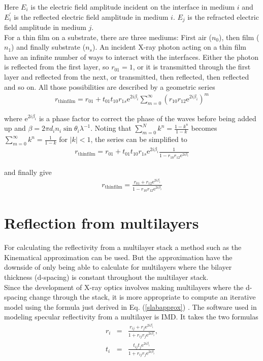 Here $E_i$ is the electric field amplitude incident on the interface in medium $i$ and $E_i^{'}$ is the reflected electric field amplitude in medium $i$. $E_j$ is the refracted electric field amplitude in medium $j$.\\

For a thin film on a substrate, there are three mediums: First air ($n_0$), then film ($n_1$) and finally substrate ($n_s$). An incident X-ray photon acting on a thin film have an infinite number of ways to interact with the interfaces. Either the photon is reflected from the first layer, so $r_{01} = 1$, or it is transmitted through the first layer and reflected from the next, or transmitted, then reflected, then reflected and so on. All those possibilities are described by a geometric series
\begin{eqnarray}
	r_{\mathrm{thin film}} = r_{01} + t_{01}t_{10}r_{1s}\mathrm{e}^{2 i \beta_i}\sum_{m=0}^{\infty}(r_{10}r_{12}\mathrm{e}^{2 i \beta_i})^m
\end{eqnarray}

where $\mathrm{e}^{2i\beta_i}$ is a phase factor to correct the phase of the waves before being added up and $\beta = 2 \pi d_i n_i \sin{\theta_i}\lambda^{-1}$. Noting that $\sum_{m=0}^{N}k^n = \frac{1 - k^n}{1-k}$ becomes $\sum_{m=0}^{\infty}k^n = \frac{1}{1-k}$ for $|k| < 1$, the series can be simplified to
\begin{eqnarray}
	r_{\mathrm{thin film}} = r_{01} + t_{01}t_{10}r_{1s}\mathrm{e}^{2i\beta_i}\frac{1}{1-r_{10}r_{12}\mathrm{e}^{2i\beta_i}}
\end{eqnarray}

and finally give
\begin{eqnarray}
	r_{\mathrm{thin film}} = \frac{r_{01} + r_{12}\mathrm{e}^{2i\beta_i}}{1-r_{10}r_{12}\mathrm{e}^{2i\beta_i}} \label{slabapprox}
\end{eqnarray}

\section{Reflection from multilayers}
For calculating the reflectivity from a multilayer stack a method such as the Kinematical approximation can be used. But the approximation have the downside of only being able to calculate for multilayers where the bilayer thickness (d-spacing) is constant throughout the multilayer stack. \\
Since the development of X-ray optics involves making multilayers where the d-spacing change through the stack, it is more appropriate to compute an iterative model using the formula just derived in Eq. (\ref{slabapprox}) . The software used in modeling specular reflectivity from a multilayer is IMD\cite{Windt:1998tb}. It takes the two formulas
\begin{eqnarray}\label{fresnelcoef}
	r_i &=& \frac{r_{ij}+r_j\mathrm{e}^{2 i \beta_i}}{1+r_{ij}r_j\mathrm{e}^{2 i \beta_i}},\\
	t_i &=& \frac{t_{ij}t_j\mathrm{e}^{2 i \beta_i}}{1+r_{ij}r_j\mathrm{e}^{2 i \beta_i}}\\
\end{eqnarray}

